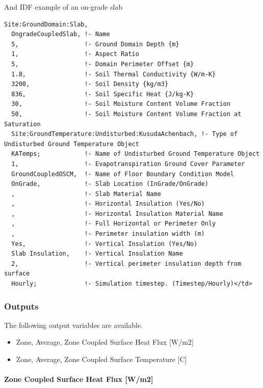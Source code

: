 And IDF example of an on-grade slab

\begin{lstlisting}
Site:GroundDomain:Slab,
  OngradeCoupledSlab, !- Name
  5,                  !- Ground Domain Depth {m}
  1,                  !- Aspect Ratio
  5,                  !- Domain Perimeter Offset {m}
  1.8,                !- Soil Thermal Conductivity {W/m-K}
  3200,               !- Soil Density {kg/m3}
  836,                !- Soil Specific Heat {J/kg-K}
  30,                 !- Soil Moisture Content Volume Fraction
  50,                 !- Soil Moisture Content Volume Fraction at Saturation
  Site:GroundTemperature:Undisturbed:KusudaAchenbach, !- Type of Undisturbed Ground Temperature Object
  KATemps;            !- Name of Undisturbed Ground Temperature Object
  1,                  !- Evapotranspiration Ground Cover Parameter
  GroundCoupledOSCM,  !- Name of Floor Boundary Condition Model
  OnGrade,            !- Slab Location (InGrade/OnGrade)
  ,                   !- Slab Material Name
  ,                   !- Horizontal Insulation (Yes/No)
  ,                   !- Horizontal Insulation Material Name
  ,                   !- Full Horizontal or Perimeter Only
  ,                   !- Perimeter insulation width (m)
  Yes,                !- Vertical Insulation (Yes/No)
  Slab Insulation,    !- Vertical Insulation Name
  2,                  !- Vertical perimeter insulation depth from surface
  Hourly;             !- Simulation timestep. (Timestep/Hourly)</td>
\end{lstlisting}

\subsubsection{Outputs}\label{outputs-1-015}

The following output variables are available.

\begin{itemize}
\tightlist
\item
  Zone, Average, Zone Coupled Surface Heat Flux {[}W/m2{]}
\item
  Zone, Average, Zone Coupled Surface Temperature {[}C{]}
\end{itemize}

\paragraph{Zone Coupled Surface Heat Flux {[}W/m2{]}}\label{zone-coupled-surface-heat-flux-wm2}

